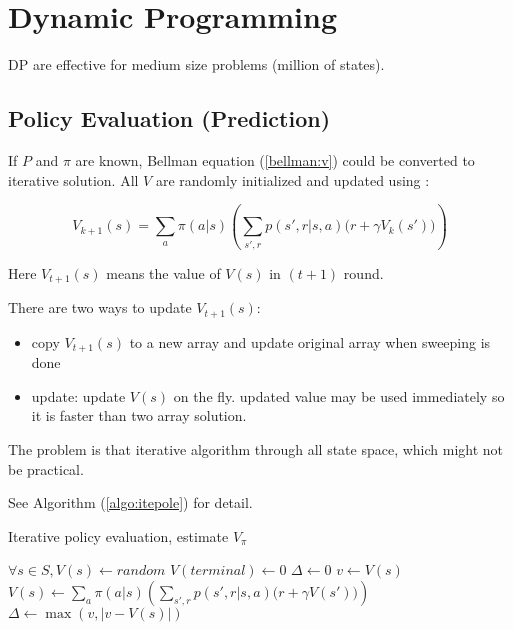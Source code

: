 


\section{Dynamic Programming}

DP are effective for medium size problems (million of states).

\subsection{Policy Evaluation (Prediction)}

If $P$ and $\pi$ are known, Bellman equation (\ref{bellman:v}) could be converted to iterative solution. All $V$ are randomly initialized and updated using :

\begin{equation}
	V_{k+1} (s) = \sum_a \pi (a | s) \left ( \sum_{s',r} p(s',r | s,a) \Big ( r + \gamma V_{k}(s') \Big ) \right )
\end{equation}

Here $V_{t+1}(s)$ means the value of $V(s)$ in $(t+1)$ round.

There are two ways to update $V_{t+1}(s)$:
\begin{itemize}
	\item copy $V_{t+1}(s)$ to a new array and update original array when sweeping is done
	\item {} update: update $V(s)$ on the fly. updated value may be used immediately so it is faster than two array solution.
\end{itemize}


The problem is that iterative algorithm  through all state space, which might not be practical.

See Algorithm (\ref{algo:itepole}) for detail.

\begin{algorithm}
	\caption{Iterative policy evaluation, estimate $V_\pi$}\label{algo:itepole}
	
	\begin{algorithmic}[1]
			\State $\forall s \in S, V(s) \gets random$
			\State $V(terminal) \gets 0$
			\Repeat
				\State $\Delta \gets 0$
					\State $v \gets V(s)$
					\State {}
					\State $V(s) \gets \sum\limits_a \pi (a | s) \left ( \sum\limits_{s',r} p(s',r | s,a) \big(r + \gamma V(s') \big ) \right )$ 
					\State $\Delta \gets \max{}(v, |v - V(s)|)$
				\EndFor
			\Until{$\Delta < \theta$}
		\EndProcedure
	\end{algorithmic}

\end{algorithm}


